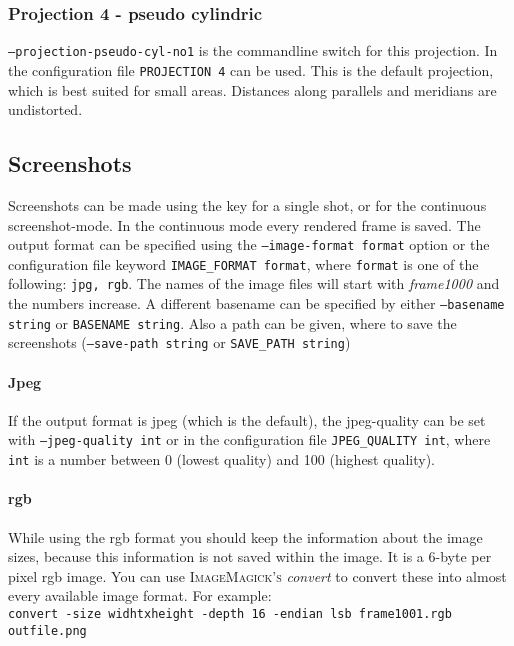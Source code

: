 \subsubsection{Projection 4 - pseudo cylindric}
\texttt{--projection-pseudo-cyl-no1} is the commandline switch for this projection. In the configuration file \texttt{PROJECTION 4} can be used. This is the default projection, which is best suited for small areas. Distances along parallels and meridians are undistorted.



\subsection{Screenshots}
\label{screenshots}
Screenshots can be made using the  key for a single shot, or  for the continuous screenshot-mode. In the continuous mode every rendered frame is saved. The output format can be specified using the \texttt{--image-format format} option or the configuration file keyword \texttt{IMAGE\_FORMAT format}, where \texttt{format} is one of the following: \texttt{jpg, rgb}.
The names of the image files will start with \emph{frame1000} and the numbers increase.
A different basename can be specified by either \texttt{--basename string} or \texttt{BASENAME string}. Also a path can be given, where to save the screenshots (\texttt{--save-path string} or \texttt{SAVE\_PATH string})

\paragraph{Jpeg}
If the output format is jpeg (which is the default), the jpeg-quality can be set with \texttt{--jpeg-quality int} or in the configuration file \texttt{JPEG\_QUALITY int}, where \texttt{int} is a number between 0 (lowest quality) and 100 (highest quality).

\paragraph{rgb}
While using the rgb format you should keep the information about the image sizes, because this information is not saved within the image. It is a 6-byte per pixel rgb image. You can use \textsc{ImageMagick's} \emph{convert} to convert these into almost every available image format. For example:\\
\texttt{convert -size widhtxheight -depth 16 -endian lsb frame1001.rgb outfile.png}


